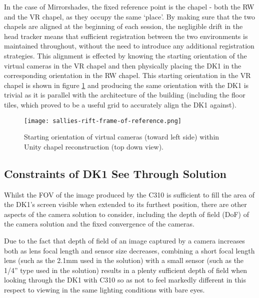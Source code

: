 In the case of Mirrorshades, the fixed reference point is the chapel - both the RW and the VR chapel, as they occupy the same `place'. By making sure that the two chapels are aligned at the beginning of each session, the negligible drift in the head tracker means that sufficient registration between the two environments is maintained throughout, without the need to introduce any additional registration strategies. This alignment is effected by knowing the starting orientation of the virtual cameras in the VR chapel and then physically placing the DK1 in the corresponding orientation in the RW chapel. This starting orientation in the VR chapel is shown in figure \ref{sallies-rift-frame-of-reference.png} and producing the same orientation with the DK1 is trivial as it is parallel with the architecture of the building (including the floor tiles, which proved to be a useful grid to accurately align the DK1 against).

\begin{figure}
	\begin{center}
		\texttt{[image: sallies-rift-frame-of-reference.png]}
		\caption{Starting orientation of virtual cameras (toward left side) within Unity chapel reconstruction (top down view).}
		\label{sallies-rift-frame-of-reference.png}
	\end{center}
\end{figure}


\subsection{Constraints of DK1 See Through Solution}

\label{constraints_of_dk1_see_through_solution}

Whilst the FOV of the image produced by the C310 is sufficient to fill the area of the DK1's screen visible when extended to its furthest position, there are other aspects of the camera solution to consider, including the depth of field (DoF) of the camera solution and the fixed convergence of the cameras.

Due to the fact that depth of field of an image captured by a camera increases both as lens focal length and sensor size decreases, combining a short focal length lens (such as the 2.1mm used in the solution) with a small sensor (such as the 1/4'' type used in the solution) results in a plenty sufficient depth of field when looking through the DK1 with C310 so as not to feel markedly different in this respect to viewing in the same lighting conditions with bare eyes.

